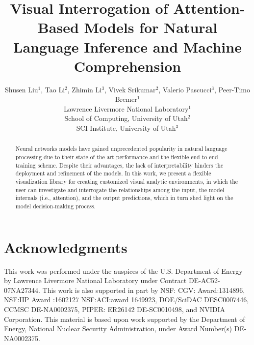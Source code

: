 \documentclass[11pt,a4paper]{article}
\title{Visual Interrogation of Attention-Based Models for Natural Language Inference and Machine Comprehension}
\author{Shusen Liu$^{1}$, Tao Li$^{2}$,  Zhimin Li$^{3}$,  Vivek Srikumar$^{2}$, Valerio Pascucci$^{3}$, Peer-Timo Bremer$^{1}$ \\
  Lawrence Livermore National Laboratory$^{1}$\\
  School of Computing, University of Utah$^{2}$\\  
  SCI Institute, University of Utah$^{3}$\\
}
\begin{document}
\maketitle


\begin{abstract}
Neural networks models have gained unprecedented popularity in natural language processing due to their state-of-the-art performance and the flexible end-to-end training scheme. Despite their advantages, the lack of interpretability hinders the deployment and refinement of the models. In this work, we present a flexible visualization library for creating customized visual analytic environments, in which the user can investigate and interrogate the relationships among the input, the model internals (i.e., attention), and the output predictions, which in turn shed light on the model decision-making process.
\end{abstract}








\section*{Acknowledgments}
This work was performed under the auspices of the U.S. Department of Energy by Lawrence Livermore National Laboratory under Contract DE-AC52-07NA27344. This work is also supported in part by NSF: CGV: Award:1314896, NSF:IIP Award :1602127 NSF:ACI:award 1649923, DOE/SciDAC DESC0007446, CCMSC DE-NA0002375, PIPER: ER26142 DE-SC0010498, and NVIDIA Corporation. This material is based upon work supported by the Department of Energy, National Nuclear Security Administration, under Award Number(s) DE-NA0002375.



\end{document}
